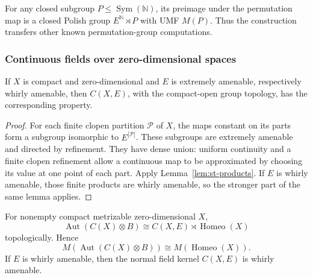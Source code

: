 For any closed subgroup $P\leq\operatorname{Sym}(\mathbb{N})$, its preimage under the
permutation map is a closed Polish group $E^\mathbb{N}\rtimes P$ with UMF $M(P)$. Thus the construction transfers other known permutation-group
computations.


\subsubsection{Continuous fields over zero-dimensional spaces}

\begin{lemma}\label{lem:st-continuous-maps}
 If $X$ is compact and zero-dimensional and $E$
is extremely amenable, respectively whirly amenable, then $C(X,E)$, with
the compact-open group topology, has the corresponding property.
\end{lemma}

\begin{proof}
For each finite clopen partition $\mathcal{P}$ of $X$, the maps constant on
its parts form a subgroup isomorphic to $E^{|\mathcal{P}|}$. These subgroups
are extremely amenable and directed by refinement. They have dense union:
uniform continuity and a finite clopen refinement allow a continuous map to
be approximated by choosing its value at one point of each part. Apply Lemma~\ref{lem:st-products}.
If $E$ is whirly amenable, those finite products are whirly amenable, so
the stronger part of the same lemma applies.
\end{proof}

\begin{proposition}\label{prop:st-field}
 For nonempty compact metrizable zero-dimensional $X$, 
\begin{equation*}
\operatorname{Aut}(C(X)\otimes B)  \cong C(X,E)\rtimes\operatorname{Homeo}(X) 
\end{equation*}
topologically. Hence 
\begin{equation*}
M(\operatorname{Aut}(C(X)\otimes B))\cong M(\operatorname{Homeo}(X)).
\end{equation*}
If $E$ is whirly amenable, then the normal field kernel $C(X,E)$ is
whirly amenable.
\end{proposition}


